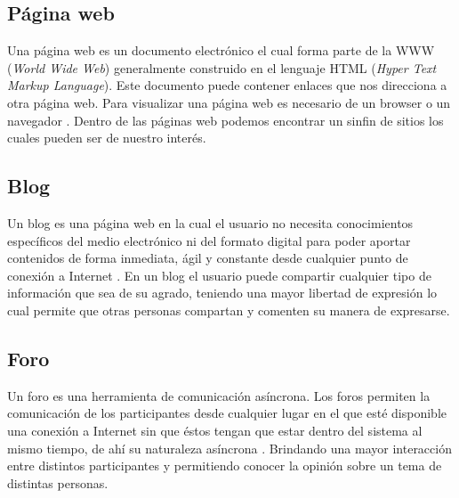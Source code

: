 \subsection{Página web}
Una página web es un documento electrónico el cual forma parte de la WWW (\textit{World Wide Web}) generalmente 
construido en el lenguaje HTML (\textit{Hyper Text Markup Language}). Este documento puede contener enlaces que nos 
direcciona a otra página web. Para visualizar una página web es necesario de un browser o un navegador \cite{trece}. 
Dentro de las páginas web podemos encontrar un sinfin de sitios los cuales pueden ser de nuestro interés.

\subsection{Blog}
Un blog es una página web en la cual el usuario no necesita conocimientos específicos del medio electrónico ni del 
formato digital para poder aportar contenidos de forma inmediata, ágil y constante desde cualquier punto de conexión 
a Internet \cite{catorce}. En un blog el usuario puede compartir cualquier tipo de información que sea de su agrado, 
teniendo una mayor libertad de expresión lo cual permite que otras personas compartan y comenten su manera de expresarse.

\subsection{Foro}
Un foro es una herramienta de comunicación asíncrona. Los foros permiten la comunicación de los participantes desde 
cualquier lugar en el que  esté  disponible  una  conexión  a Internet  sin  que  éstos  tengan  que  estar dentro del 
sistema al mismo tiempo, de ahí su naturaleza asíncrona \cite{quince}. Brindando una mayor interacción entre distintos 
participantes y permitiendo conocer la opinión sobre un tema de distintas personas.


